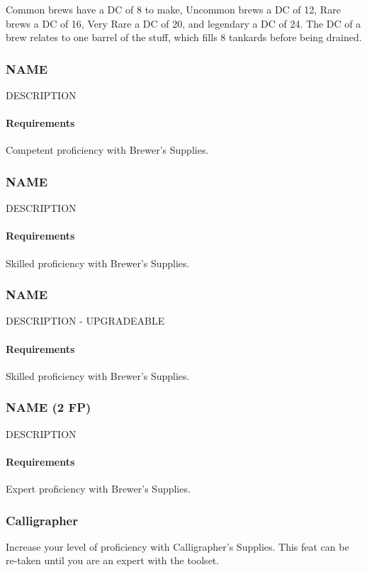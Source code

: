     Common brews have a DC of 8 to make, Uncommon brews a DC of 12, Rare brews a DC of 16, Very Rare a DC of 20, and legendary a DC of 24.
    The DC of a brew relates to one barrel of the stuff, which fills 8 tankards before being drained.
\subsubsection{NAME} \label{feat::name}
    DESCRIPTION %
    \paragraph{Requirements} Competent proficiency with Brewer's Supplies.
\subsubsection{NAME} \label{feat::name}
    DESCRIPTION %
    \paragraph{Requirements} Skilled proficiency with Brewer's Supplies.
\subsubsection{NAME} \label{feat::name}
    DESCRIPTION - UPGRADEABLE %
    \paragraph{Requirements} Skilled proficiency with Brewer's Supplies.
\subsubsection{NAME (2 FP)} \label{feat::name}
    DESCRIPTION %
    \paragraph{Requirements} Expert proficiency with Brewer's Supplies.
\subsubsection{Calligrapher} \label{feat::calligrapher}
    Increase your level of proficiency with Calligrapher's Supplies.
    This feat can be re-taken until you are an expert with the toolset.
